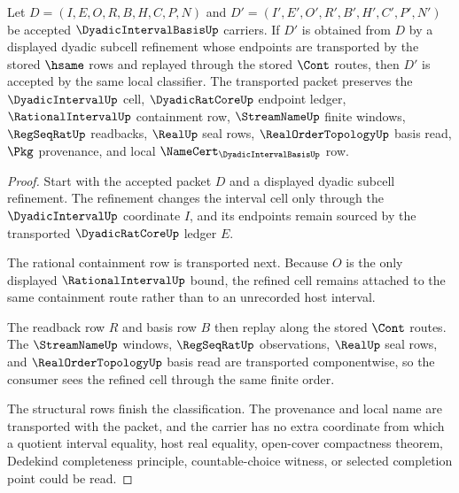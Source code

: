 \begin{theorem}
\label{thm:dyadic-interval-basis-refinement-stability}
Let $D=(I,E,O,R,B,H,C,P,N)$ and $D'=(I',E',O',R',B',H',C',P',N')$ be accepted $\DyadicIntervalBasisUp$ carriers. If $D'$ is obtained from $D$ by a displayed dyadic subcell refinement whose endpoints are transported by the stored $\hsame$ rows and replayed through the stored $\Cont$ routes, then $D'$ is accepted by the same local classifier. The transported packet preserves the $\DyadicIntervalUp$ cell, $\DyadicRatCoreUp$ endpoint ledger, $\RationalIntervalUp$ containment row, $\StreamNameUp$ finite windows, $\RegSeqRatUp$ readbacks, $\RealUp$ seal rows, $\RealOrderTopologyUp$ basis read, $\Pkg$ provenance, and local $\NameCert_{\DyadicIntervalBasisUp}$ row.
\end{theorem}
\begin{proof}
Start with the accepted packet $D$ and a displayed dyadic subcell refinement. The refinement changes the interval cell only through the $\DyadicIntervalUp$ coordinate $I$, and its endpoints remain sourced by the transported $\DyadicRatCoreUp$ ledger $E$.

The rational containment row is transported next. Because $O$ is the only displayed $\RationalIntervalUp$ bound, the refined cell remains attached to the same containment route rather than to an unrecorded host interval.

The readback row $R$ and basis row $B$ then replay along the stored $\Cont$ routes. The $\StreamNameUp$ windows, $\RegSeqRatUp$ observations, $\RealUp$ seal rows, and $\RealOrderTopologyUp$ basis read are transported componentwise, so the consumer sees the refined cell through the same finite order.

The structural rows finish the classification. The provenance and local name are transported with the packet, and the carrier has no extra coordinate from which a quotient interval equality, host real equality, open-cover compactness theorem, Dedekind completeness principle, countable-choice witness, or selected completion point could be read.
\end{proof}

